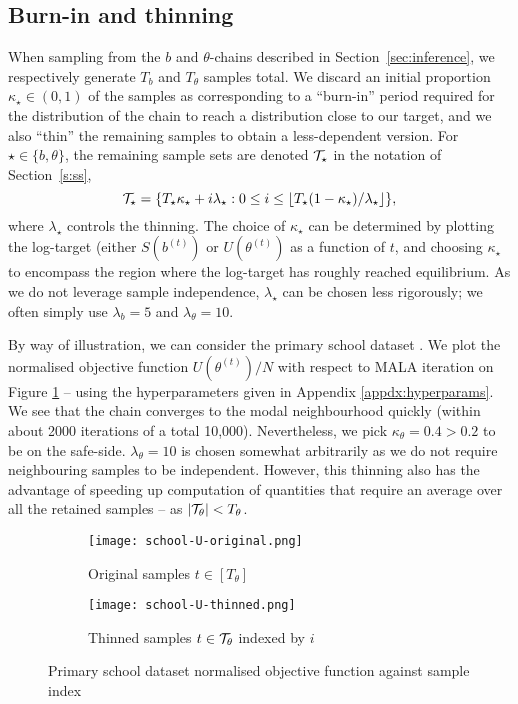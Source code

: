 \FloatBarrier
\subsection{Burn-in and thinning}
\label{appdx:burn-in-thinning}

When sampling from the $b$ and $\theta$-chains described
in Section~\ref{sec:inference}, we respectively generate
$T_b$ and $T_\theta$ samples total.
We discard an initial proportion $\kappa_\star\in(0,1)$ of the samples 
as corresponding to a ``burn-in'' period required for the distribution 
of the chain to reach a distribution close to our target,
and we also ``thin'' the remaining samples to 
obtain a less-dependent version. For $\star\in\{b,\theta\}$,
the remaining sample sets are denoted $\mathcal{T}_\star$
in the notation of Section~\ref{s:ss},
%
\begin{equation}
	\mathcal{T}_\star = \{T_\star \kappa_\star + i \lambda_\star :  
	0 \leq i \leq \lfloor T_\star(1 - \kappa_\star) / \lambda_\star \rfloor \},
\end{equation}
%
where $\lambda_\star$ controls the thinning. The choice of
$\kappa_\star$ can be determined by plotting the log-target (either $S(b^{(t)})$ 
or $U(\theta^{(t)})$ as a function of $t$,
and choosing $\kappa_\star$ to encompass the region where the log-target has 
roughly reached equilibrium. As we do not leverage sample independence,
$\lambda_\star$ can be chosen less rigorously; we often simply
use $\lambda_b=5$ and $\lambda_\theta = 10$.

By way of illustration, we can consider the primary school dataset \cite{schools}. We plot the normalised objective function $U\left( \theta^{(t)} \right) / N$ with respect to MALA iteration on Figure \ref{fig:school-U-orginal} -- using the hyperparameters given in Appendix \ref{appdx:hyperparams}. We see that the chain converges to the modal neighbourhood quickly (within about 2000 iterations of a total 10,000). Nevertheless, we pick $\kappa_\theta=0.4 > 0.2$ to be on the safe-side. $\lambda_\theta=10$ is chosen somewhat arbitrarily as we do not require neighbouring samples to be independent. However, this thinning also has the advantage of speeding up computation of quantities that require an average over all the retained samples -- as $|\mathcal{T}_\theta| < T_\theta$.
%
\begin{figure}[!h]
	\centering
	\begin{subfigure}[t]{0.4\linewidth}
		\centering
		\texttt{[image: school-U-original.png]}
		\caption{Original samples $t \in [T_\theta]$}
		\label{fig:school-U-orginal}
	\end{subfigure}
	\begin{subfigure}[t]{0.4\linewidth}
		\centering
		\texttt{[image: school-U-thinned.png]}
		\caption{Thinned samples $t \in \mathcal{T}_\theta$ indexed by $i$}
		\label{fig:school-U-thinned}
	\end{subfigure}
	\hspace{1cm}
	\caption{Primary school dataset normalised objective function against sample index}
\end{figure}

